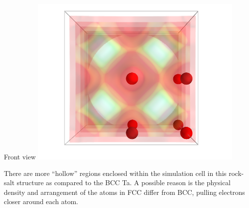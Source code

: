 \documentclass[11pt]{article}
\begin{document}
\begin{itemize}
Front view
\includegraphics[width=.9\linewidth]{./images/TaC_front.png}

There are more ``hollow'' regions enclosed within the simulation cell in this rock-salt structure  as compared to the BCC Ta.  A possible reason is the physical density and arrangement of the atoms in FCC differ from BCC, pulling electrons closer around each atom.
\end{itemize} %
\end{document}
